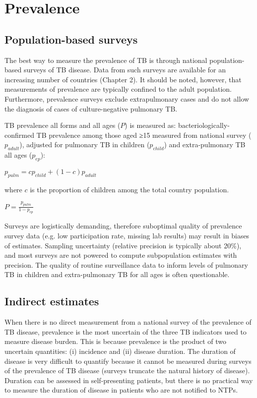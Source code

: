 \section{Prevalence}

\subsection{Population-based surveys}
The best way to measure the prevalence of TB is through national population-based surveys of TB disease\cite{18713496}\cite{WHO2011}. Data from such surveys are available for an increasing number of countries (Chapter 2). It should be noted, however, that measurements of prevalence are typically confined to the adult population. Furthermore, prevalence surveys exclude extrapulmonary cases and do not allow the diagnosis of cases of culture-negative pulmonary TB. 

TB prevalence all forms and all ages ($P$) is measured as: bacteriologically-confirmed TB prevalence among those aged ≥15 measured from national survey ($p_{adult}$), adjusted for pulmonary TB in children ($p_{child}$) and extra-pulmonary TB all ages ($p_{ep}$):

$p_{pulm} = c p_{child} + (1 − c) p_{adult}$

where $c$ is the proportion of children among the total country population.

$P = \frac{p_{pulm}}{1 - p_{ep}}$

Surveys are logistically demanding, therefore suboptimal quality of prevalence survey data (e.g. low participation rate, missing lab results) may result in biases of estimates. Sampling uncertainty (relative precision is typically about 20\%), and most surveys are not powered to compute subpopulation estimates with precision. The  quality of routine surveillance data to inform levels of pulmonary TB in children and extra-pulmonary TB for all ages is often questionable.

\subsection{Indirect estimates}
When there is no direct measurement from a national survey of the prevalence of TB disease, prevalence is the most uncertain of the three TB indicators used to measure disease burden. This is because prevalence is the product of two uncertain quantities: (i) incidence and (ii) disease duration. The duration of disease is very difficult to quantify because it cannot be measured during surveys of the prevalence of TB disease (surveys truncate the natural history of disease). Duration can be assessed in self-presenting patients, but there is no practical way to measure the duration of disease in patients who are not notified to NTPs.

